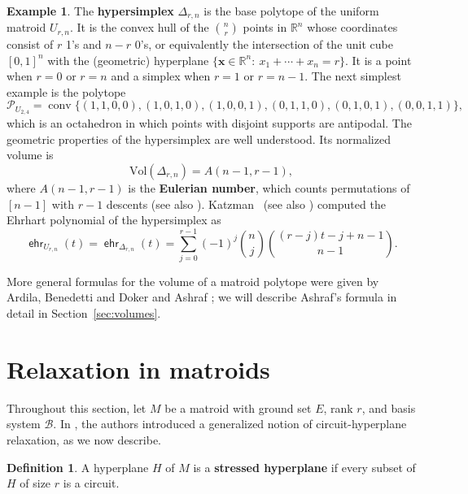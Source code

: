 \documentclass[11pt]{amsart}
\theoremstyle{definition}
\newtheorem{definition}[theorem]{Definition}
\newtheorem{example}[theorem]{Example}
\newcommand{\0}{\emptyset}
\DeclareMathOperator{\conv}{conv}
\newcommand{\R}{\mathbb{R}}
\newcommand{\bx}{\mathbf{x}}
\newcommand{\B}{\mathcal{B}}
\newcommand{\Po}{\mathcal{P}}
\newcommand{\Vol}{\mathrm{Vol}}
\DeclareMathOperator{\ehr}{\mathsf{ehr}}
\newcommand{\defterm}[1]{\textbf{#1}}
\begin{document}
\begin{example}
The \defterm{hypersimplex} $\Delta_{r,n}$ is the base polytope of the uniform matroid $U_{r,n}$.
It is the convex hull of the $\binom{n}{r}$ points in $\R^n$ whose coordinates consist of $r$ 1's and $n-r$ 0's, or equivalently the intersection of the unit cube $[0,1]^n$ with the (geometric) hyperplane $\{\bx\in\R^n:\ x_1+\cdots+x_n=r\}$.
It is a point when $r=0$ or $r=n$ and a simplex when $r=1$ or $r=n-1$.
The next simplest example is the polytope
\[\Po_{U_{2,4}}=\conv\{(1,1,0,0), (1,0,1,0), (1,0,0,1), (0,1,1,0),(0,1,0,1),(0,0,1,1)\},\]
which is an octahedron in which points with disjoint supports are antipodal.
The geometric properties of the hypersimplex are well understood.
Its normalized volume  is
\begin{equation} \label{eq:volume-hypersimplex}
\Vol(\Delta_{r,n})=A(n-1,r-1),
\end{equation}
where $A(n-1,r-1)$ is the \defterm{Eulerian number}, which counts permutations of $[n-1]$ with $r-1$ descents \cite[sequence A008292]{OEIS} (see also \cite[pp.32--35]{Stanley}).
Katzman~\cite[Cor.~2.2]{Katzman} (see also \cite[Problem~4.62]{Stanley}) computed the Ehrhart polynomial of the hypersimplex as
\begin{equation} \label{eq:Katzman}
\ehr_{U_{r,n}}(t)=\ehr_{\Delta_{r,n}}(t)=\sum_{j=0}^{r-1}(-1)^j\binom{n}{j} \binom{(r-j)t-j+n-1}{n-1}.
\end{equation}
\end{example}

More general formulas for the volume of a matroid polytope were given by Ardila, Benedetti and Doker \cite{ABD} and Ashraf \cite{Ashraf}; we will describe Ashraf's formula in detail in Section~\ref{sec:volumes}.

\section{Relaxation in matroids}\label{sec:relax}

Throughout this section, let $M$ be a matroid with ground set $E$, rank $r$, and basis system $\B$.
In \cite{relaxation}, the authors introduced a generalized notion of circuit-hyperplane relaxation, as we now describe.

\begin{definition}{\cite[Def.~3.1]{relaxation}}\label{def:stressed}
A hyperplane $H$ of $M$ is a \defterm{stressed hyperplane} if every subset of $H$ of size $r$ is a circuit.
\end{definition}
\end{document}
